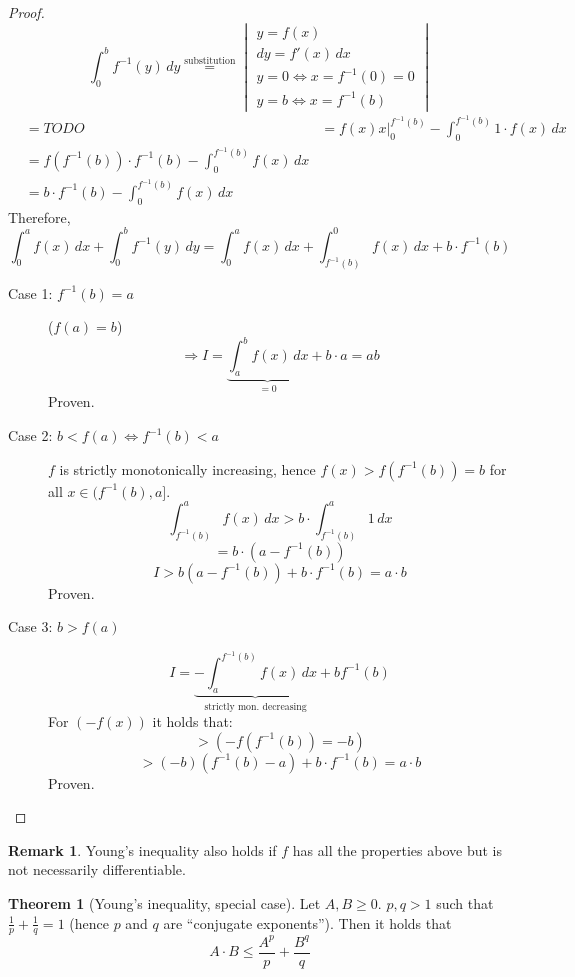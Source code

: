 \documentclass[a4paper,landscape,twocolumn]{article}
\theoremstyle{definition}
\newtheorem{theorem}{Theorem}
\newtheorem{rem}{Remark}
\begin{document}
\begin{proof}
  \[ \int_0^b f^{-1}(y) \, dy \overset{\text{substitution}}{=}
    \begin{vmatrix}
      y = f(x) \\
      dy = f'(x) \, dx \\
      y = 0 \Leftrightarrow x = f^{-1}(0) = 0 \\
      y = b \Leftrightarrow x = f^{-1}(b)
    \end{vmatrix}
  \]
  \begin{align*}
    &= TODO
    &= \left. f(x) x \right|_0^{f^{-1}(b)} - \int_0^{f^{-1}(b)} 1 \cdot f(x) \, dx \\
    &= f(f^{-1}(b)) \cdot f^{-1}(b) - \int_0^{f^{-1}(b)} f(x) \, dx \\
    &= b \cdot f^{-1}(b) - \int_0^{f^{-1}(b)} f(x) \, dx
  \end{align*}
  Therefore,
  \[
    \int_0^a f(x) \, dx + \int_0^b f^{-1}(y) \, dy
    = \int_0^a f(x) \, dx + \int_{f^{-1}(b)}^0 f(x) \, dx + b \cdot f^{-1}(b)
  \]

  \begin{description}
    \item[Case 1: $f^{-1}(b) = a$] ($f(a) = b$)
      \[
        \Rightarrow I = \underbrace{\int_a^b f(x) \, dx}_{=0} + b \cdot a = ab
      \]
      Proven.
    \item[Case 2: $b < f(a) \Leftrightarrow f^{-1}(b) < a$]
      $f$ is strictly monotonically increasing, hence $f(x) > f(f^{-1}(b)) = b$
      for all $x \in (f^{-1}(b), a]$.
      \[ \int_{f^{-1}(b)}^a f(x) \, dx > b \cdot \int_{f^{-1}(b)}^a 1 \, dx \]
      \[ = b \cdot \left(a - f^{-1}(b)\right) \]
      \[ I > b \left(a - f^{-1}(b)\right) + b \cdot f^{-1}(b) = a \cdot b \]
      Proven.
    \item[Case 3: $b > f(a)$]
      \[ I = \underbrace{- \int_a^{f^{-1}(b)} f(x) \, dx}_{\text{strictly mon. decreasing}} + b f^{-1}(b) \]
      For $(-f(x))$ it holds that:
      \[ > (-f(f^{-1}(b)) = -b) \]
      \[ > (-b) \left(f^{-1}(b) - a\right) + b \cdot f^{-1}(b) = a \cdot b \]
      Proven.
  \end{description}
\end{proof}
\begin{rem}
  Young's inequality also holds if $f$ has all the properties above
  but is not necessarily differentiable.
\end{rem}
\begin{theorem}[Young's inequality, special case]
  Let $A, B \geq 0$. $p,q > 1$ such that $\frac1p + \frac1q = 1$ (hence $p$ and $q$ are \enquote{conjugate exponents}).
  Then it holds that
  \[ A \cdot B \leq \frac{A^p}{p} + \frac{B^q}{q} \]
\end{theorem}
\end{document}

